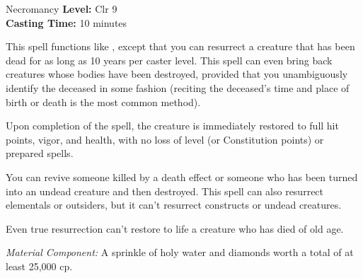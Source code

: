 {Necromancy}
{
	\textbf{Level:}
	Clr 9\\
	\textbf{Casting Time:}
	10 minutes\\
}
{
	This spell functions like , except that you can resurrect a creature that has been dead for as long as 10 years per caster level. This spell can even bring back creatures whose bodies have been destroyed, provided that you unambiguously identify the deceased in some fashion (reciting the deceased's time and place of birth or death is the most common method).

	Upon completion of the spell, the creature is immediately restored to full hit points, vigor, and health, with no loss of level (or Constitution points) or prepared spells.

	You can revive someone killed by a death effect or someone who has been turned into an undead creature and then destroyed. This spell can also resurrect elementals or outsiders, but it can't resurrect constructs or undead creatures.

	Even true resurrection can't restore to life a creature who has died of old age.

	\textit{Material Component:}
	A sprinkle of holy water and diamonds worth a total of at least 25,000 cp.

}

